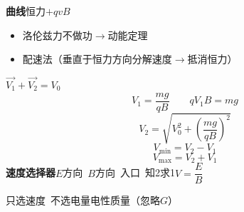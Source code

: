 \textbf{曲线}\quad 恒力$+qvB$
\begin{itemize}
\item 洛伦兹力不做功$\to$动能定理
\item 配速法\quad （垂直于恒力方向分解速度$\to$抵消恒力）
\end{itemize}
$\vec{V_1}+\vec{V_2}=V_0$
\[ V_1=\frac{mg}{qB}\qquad qV_1B=mg \]
\[ V_2=\sqrt{V_0^2+\left(\frac{mg}{qB}\right)^2} \]
\[ V_{\min}=V_2-V_1 \]
\[ V_{\max}=V_2+V_1 \]
\textbf{速度选择器}\quad $E$方向\ $B$方向\ 入口\ 知2求1\quad $V=\dfrac{E}{B}$

只选速度\ 不选电量电性质量（忽略$G$）

